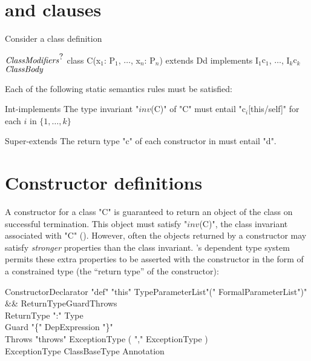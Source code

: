 \section{ and  clauses}\label{DepType:Implements}
\label{DepType:Extends}
Consider a class definition
\begin{xtenmath}
$\mbox{\emph{ClassModifiers}}^{\mbox{?}}$
class C(x$_1$: P$_1$, $\dots$, x$_n$: P$_n$) extends D{d}
   implements I$_1${c$_1$}, $\dots$, I$_k${c$_k$}
$\mbox{\emph{ClassBody}}$
\end{xtenmath}

Each of the following static semantics rules must be satisfied:

\begin{staticrule}{Int-implements}
The type invariant \xcdmath"$\mathit{inv}$(C)" of \xcd"C" must entail
\xcdmath"c$_i$[this/self]" for each $i$ in $\{1, \dots, k\}$
\end{staticrule}

\begin{staticrule}{Super-extends}
The return type \xcd"c" of each constructor in 
must entail \xcd"d".
\end{staticrule}

\section{Constructor definitions}

A constructor for a class \xcd"C" is guaranteed to return an object of the
class on successful termination. This object must satisfy  \xcdmath"$\mathit{inv}$(C)", the
class invariant associated with \xcd"C" ().
However,
often the objects returned by a constructor may satisfy {\em stronger}
properties than the class invariant. \Xten{}'s dependent type system
permits these extra properties to be asserted with the constructor in
the form of a constrained type (the ``return type'' of the constructor):

\begin{grammar}
ConstructorDeclarator \:
  \xcd"def" \xcd"this" TypeParameterList\opt \xcd"(" FormalParameterList\opt \xcd")" \\
  && ReturnType\opt Guard\opt Throws\opt \\
ReturnType    \: \xcd":" Type \\
Guard   \: "\{" DepExpression "\}" \\
Throws    \: \xcd"throws" ExceptionType  ( \xcd"," ExceptionType )\star \\
ExceptionType \: ClassBaseType Annotation\star \\
\end{grammar}

